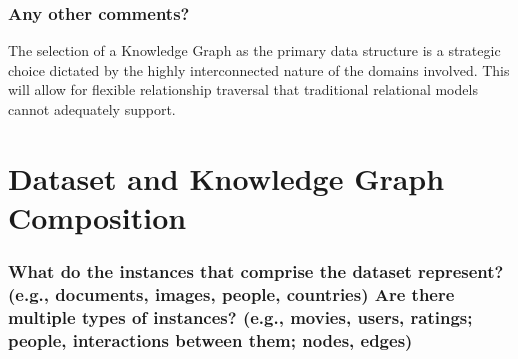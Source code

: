\documentclass{article}
\newcommand{\question}[1]{#1}
\begin{document}
\question{\subsubsection*{Any other comments?}}
The selection of a Knowledge Graph as the primary data structure is a strategic choice dictated by the highly interconnected nature of the domains involved. This will allow for flexible relationship traversal that traditional relational models cannot adequately support.


\section{Dataset and Knowledge Graph Composition}

\question{\subsubsection*{What do the instances that comprise the dataset represent? (e.g., documents, images, people, countries) Are there multiple types of instances? (e.g., movies, users, ratings; people, interactions between them; nodes, edges)}}
\end{document}
